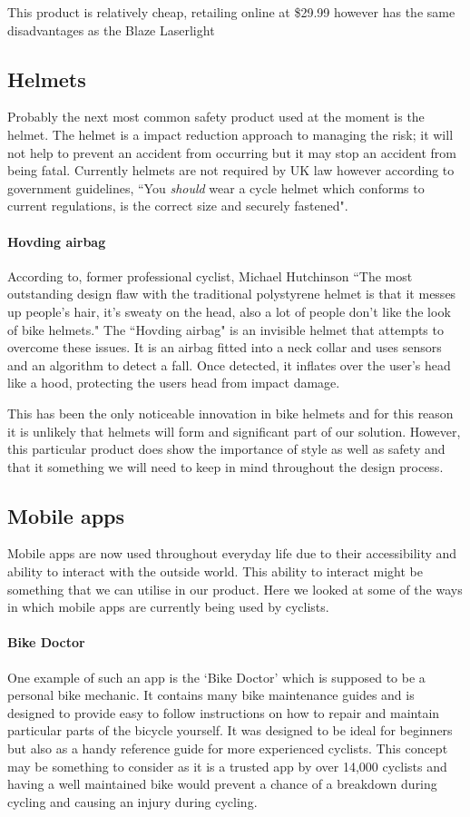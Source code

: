 \documentclass[a4paper]{report}
\begin{document}
{This product is relatively cheap, retailing online at \$29.99 however has the same disadvantages as the Blaze Laserlight

\subsection{Helmets}
Probably the next most common safety product used at the moment is the helmet. The helmet is a impact reduction approach to managing the risk; it will not help to prevent an accident from occurring but it may stop an accident from being fatal. Currently helmets are not required by UK law however according to government guidelines, ``You \textit{should} wear a cycle helmet which conforms to current regulations, is the correct size and securely fastened"\cite{helmet_gov}.

\paragraph{Hovding airbag}According to, former professional cyclist, Michael Hutchinson ``The most outstanding design flaw with the traditional polystyrene helmet is that it messes up people's hair, it's sweaty on the head, also a lot of people don't like the look of bike helmets."\cite{hutch} The ``Hovding airbag" \cite{hovding} is an invisible helmet that attempts to overcome these issues. It is an airbag fitted into a neck collar and uses sensors and an algorithm to detect a fall. Once detected, it inflates over the user’s head like a hood, protecting the users head from impact damage.

This has been the only noticeable innovation in bike helmets and for this reason it is unlikely that helmets will form and significant part of our solution. However, this particular product does show the importance of style as well as safety and that it something we will need to keep in mind throughout the design process.

\subsection{Mobile apps}
Mobile apps are now used throughout everyday life due to their accessibility and ability to interact with the outside world. This ability to interact might be something that we can utilise in our product. Here we looked at some of the ways in which mobile apps are currently being used by cyclists.

\paragraph{Bike Doctor} One example of such an app is the `Bike Doctor'\cite{bike_doctor} which is supposed to be a personal bike mechanic. It contains many bike maintenance guides and is designed to provide easy to follow instructions on how to repair and maintain particular parts of the bicycle yourself. It was designed to be ideal for beginners but also as a handy reference guide for more experienced cyclists. This concept may be something to consider as it is a trusted app by over 14,000 cyclists and having a well maintained bike would prevent a chance of a breakdown during cycling and causing an injury during cycling. 

}
\end{document}
